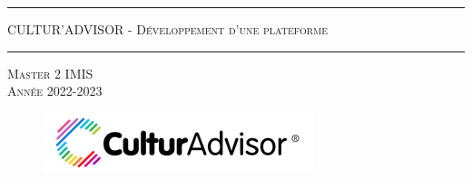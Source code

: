 \documentclass{article} %
\title{}
\author{} %
\date{}
\begin{document}
\hrule
\begin{center}
\Huge {\textsc{CULTUR'ADVISOR - Développement d'une plateforme}}
\end{center}
\hrule
\vspace{10mm}
\begin{center}
\Large \textsc{Master 2 IMIS \\ Année 2022-2023}
\end{center}
\vspace{15mm}
\begin{figure}[H]
\hspace{-10mm}
\includegraphics[scale = 1.7]{images/logo.png}
\end{figure}
\vspace{30mm}
\end{document}
